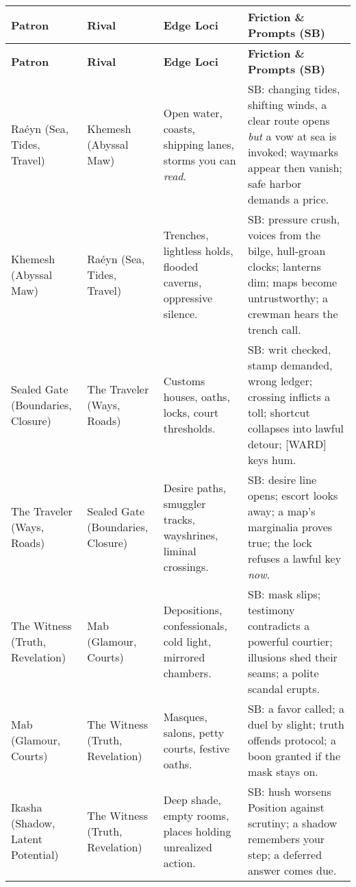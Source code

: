 \begin{longtable}{@{}p{3.3cm}p{3.3cm}p{4.6cm}p{7.2cm}@{}}
\toprule
\textbf{Patron} & \textbf{Rival} & \textbf{Edge Loci} & \textbf{Friction \& Prompts (SB)} \\
\midrule
\endfirsthead

\toprule
\textbf{Patron} & \textbf{Rival} & \textbf{Edge Loci} & \textbf{Friction \& Prompts (SB)} \\
\midrule
\endhead

\bottomrule
\endfoot

Raéyn (Sea, Tides, Travel) & Khemesh (Abyssal Maw) &
Open water, coasts, shipping lanes, storms you can \emph{read}. &
SB: changing tides, shifting winds, a clear route opens \emph{but} a vow at sea is invoked; waymarks appear then vanish; safe harbor demands a price. \\

Khemesh (Abyssal Maw) & Raéyn (Sea, Tides, Travel) &
Trenches, lightless holds, flooded caverns, oppressive silence. &
SB: pressure crush, voices from the bilge, hull-groan clocks; lanterns dim; maps become untrustworthy; a crewman hears the trench call. \\

Sealed Gate (Boundaries, Closure) & The Traveler (Ways, Roads) &
Customs houses, oaths, locks, court thresholds. &
SB: writ checked, stamp demanded, wrong ledger; crossing inflicts a toll; shortcut collapses into lawful detour; [WARD] keys hum. \\

The Traveler (Ways, Roads) & Sealed Gate (Boundaries, Closure) &
Desire paths, smuggler tracks, wayshrines, liminal crossings. &
SB: desire line opens; escort looks away; a map’s marginalia proves true; the lock refuses a lawful key \emph{now}. \\

The Witness (Truth, Revelation) & Mab (Glamour, Courts) &
Depositions, confessionals, cold light, mirrored chambers. &
SB: mask slips; testimony contradicts a powerful courtier; illusions shed their seams; a polite scandal erupts. \\

Mab (Glamour, Courts) & The Witness (Truth, Revelation) &
Masques, salons, petty courts, festive oaths. &
SB: a favor called; a duel by slight; truth offends protocol; a boon granted if the mask stays on. \\

Ikasha (Shadow, Latent Potential) & The Witness (Truth, Revelation) &
Deep shade, empty rooms, places holding unrealized action. &
SB: hush worsens Position against scrutiny; a shadow remembers your step; a deferred answer comes due. \\


\end{longtable}
